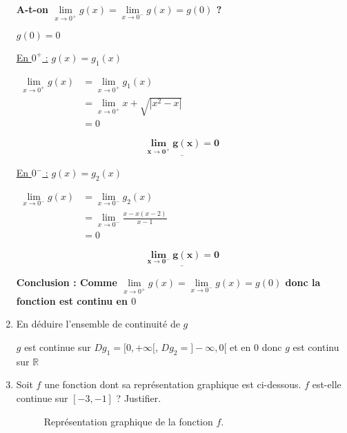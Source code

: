 \documentclass[12pt,a4paper]{article}
\begin{document}
\begin{enumerate}
\textbf{A-t-on $ \lim\limits_{x \to 0^{+}}g(x) = \lim\limits_{x \to 0^{-}}g(x) = g(0) $ ?}

\textbf{$g(0)=0$ }   
    
    \underline{En $0^{+}$ :} $g(x) = g_{1}(x)$

										\(
									\begin{aligned}
											\lim\limits_{x \to 0^{+}}g(x) &= \lim\limits_{x \to 0^{+}}g_{1}(x)\\
																											&= \lim\limits_{x \to 0^{+}}x + \sqrt{|x^2 - x|}\\
																											&=0
									\end{aligned}
									\)    
 
										\begin{resultbox}
                        \[
                            \mathbf{ \underline{\lim\limits_{x \to 0^{+}}g(x) = 0} }
                        \]
                    \end{resultbox}       

\underline{En $0^{-}$ :} $g(x) = g_{2}(x)$

										\(
									\begin{aligned}
											\lim\limits_{x \to 0^{-}}g(x) &= \lim\limits_{x \to 0^{-}}g_{2}(x)\\
																											&= \lim\limits_{x \to 0^{-}}\frac{x - x(x-2)}{x - 1}\\
																											&=0
									\end{aligned}
									\)    

											\begin{resultbox}
                        \[
                            \mathbf{ \underline{\lim\limits_{x \to 0^{-}}g(x) = 0} }
                        \]
                    \end{resultbox}     
    \textbf{Conclusion : Comme $ \lim\limits_{x \to 0^{+}}g(x) = \lim\limits_{x \to 0^{-}}g(x) = g(0) $ donc la fonction est continu en $0$}  
    \item En déduire l'ensemble de continuité de \( g \)

\( g \) est continue sur  $Dg_{1} = [0,+\infty[$,  $Dg_{2} = ]-\infty, 0[$  et en $0$ donc $g$ est continu sur $\mathbb{R}$ 
    
    \item Soit \( f \) une fonction dont sa représentation graphique est ci-dessous. \( f \) est-elle continue sur \( [-3, -1] \) ? Justifier.
          \begin{center}
              \begin{figure}[H]
                  \caption{Représentation graphique de la fonction \( f \).}
                  \label{fig:fonction_f}
              \end{figure}
          \end{center}
\end{enumerate}
\end{document}
